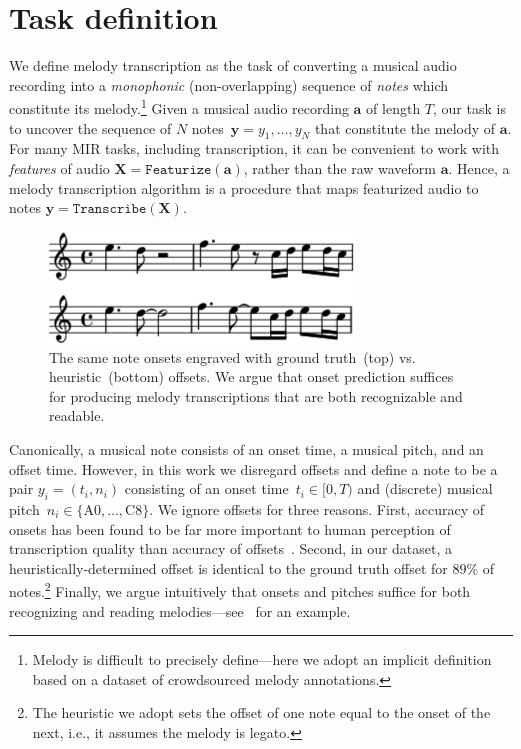 \section{Task definition}
\label{sec:task}

We define melody transcription as the task of converting a musical audio recording into a \emph{monophonic} (non-overlapping) sequence of \emph{notes} which constitute its melody.\footnote{Melody is difficult to precisely define---here we adopt an implicit definition based on a dataset of crowdsourced melody annotations.} Given a musical audio recording $\bm{a}$ of length $T$, our task is to 
uncover 
the sequence of $N$ notes~${\bm{y} = y_1,\dots,y_N}$ that constitute the melody of $\bm{a}$.  For many MIR tasks, including transcription, it can be convenient to work with \emph{features} of audio ${\bm{X} = \texttt{Featurize}(\bm{a})}$, rather than the raw waveform $\bm{a}$. 
Hence, a melody transcription algorithm is a procedure that maps featurized audio to notes ${\bm{y} = \texttt{Transcribe}(\bm{X})}$. 

\begin{figure}
    \centering
    \includegraphics[width=8.1cm]{figs/heuristic_offsets.pdf}
    \caption{
The same note onsets engraved with ground truth~(top) vs. heuristic~(bottom) offsets. 
We argue that onset prediction suffices for producing melody transcriptions that are both recognizable and readable. 
}
 \label{fig:heuristic_offsets}
\end{figure}

Canonically, a musical note consists of an onset time, a musical pitch, and an offset time. 
However, in this work  
we disregard offsets and define a note to be a pair ${y_i = (t_i,n_i)}$ consisting of an onset time~${t_i \in [0,T)}$ and (discrete) musical pitch~${n_i \in \{\text{A0},\dots,\text{C8}\}}$.
We ignore offsets for three reasons. 
First, accuracy of onsets has been found to be far more important to human perception of transcription quality than accuracy of offsets~\cite{ycart2020investigating}. 
Second, in our dataset,
a heuristically-determined offset is identical to the ground truth offset for $89\%$ of notes.\footnote{The heuristic we adopt sets the offset of one note equal to the onset of the next, i.e., it assumes the melody is legato.}
Finally, we argue intuitively that onsets and pitches suffice for both recognizing and reading melodies---see~ for an example.

